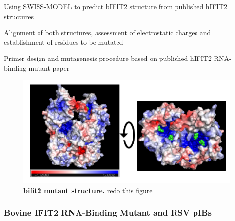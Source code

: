 Using SWISS-MODEL to predict bIFIT2 structure from published hIFIT2 structures

Alignment of both structures, assessment of electrostatic charges and establishment of residues to be mutated

Primer design and mutagenesis procedure based on published hIFIT2 RNA-binding mutant paper
\cite{Tran2020InfluenzaMRNAs}

\begin{figure}
    \centering
    \includegraphics[width=1\linewidth]{08. Chapter 3/Figs/03. pIB/03. IFIT2/05. IFIT2-RNA binding mutant/01. Structure/01. structure.png}
    \caption[ifit2 mutant structure]{\textbf{bifit2 mutant structure.} redo this figure}
    \label{fig:ifit2 mutant structure}
\end{figure}

\subsubsection{Bovine IFIT2 RNA-Binding Mutant and RSV pIBs} \label{Bovine IFIT2 RNA-Binding Mutant and RSV pIBs}


